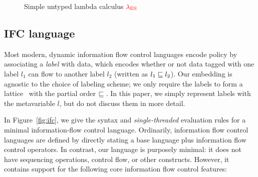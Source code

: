 \documentclass{sigplanconf}
\newcommand{\Varid}[1]{\mathit{#1}}
\newcommand{\Red}[1]{{\color{red} #1}}
\begin{document}
\begin{figure}

\caption{Simple untyped lambda calculus \ensuremath{\Red{\lambda_{\text{ES}}}}}
\label{fig:ml}
\end{figure}

\subsection{IFC language}

Most modern, dynamic information flow control languages encode
policy by associating a \emph{label}
with data, which encodes whether or not data tagged with one
label \ensuremath{l_{1}} can flow to another label \ensuremath{l_{2}} (written as \ensuremath{l_{1}\flows{}l_{2}}).
Our embedding is agnostic to the choice of labeling scheme; we only
require the labels to form a lattice~\cite{Denning:1976:LMS:360051.360056}
with the partial order \ensuremath{\flows{}}.
In this paper, we simply represent labels with the metavariable
$l$, but do not discuss them in more detail.

In Figure~\ref{fig:ifc}, we give the syntax and \emph{single-threaded}
evaluation rules for a minimal information-flow control language.  
Ordinarily, information flow control languages are defined by directly
stating a base language plus information flow control operators.  In
contrast, our language is purposely minimal: it does not have sequencing
operations, control flow, or other constructs.  However, it contains
support for the following core information flow control features:
\end{document}
